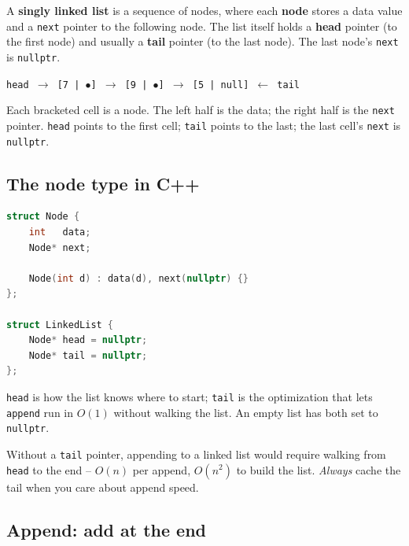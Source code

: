 \documentclass[11pt]{article}
\begin{document}
\begin{defnbox}
A \textbf{singly linked list} is a sequence of nodes, where each
\textbf{node} stores a data value and a \texttt{next} pointer to the
following node. The list itself holds a \textbf{head} pointer (to
the first node) and usually a \textbf{tail} pointer (to the last
node). The last node's \texttt{next} is \texttt{nullptr}.
\end{defnbox}

\begin{ideabox}
\texttt{head $\to$ [7 | $\bullet$] $\to$ [9 | $\bullet$] $\to$ [5 | null] $\leftarrow$ tail}

Each bracketed cell is a node. The left half is the data; the right
half is the \texttt{next} pointer. \texttt{head} points to the first
cell; \texttt{tail} points to the last; the last cell's \texttt{next}
is \texttt{nullptr}.
\end{ideabox}

\subsection{The node type in C++}

\begin{examplebox}
\begin{lstlisting}[basicstyle=\ttfamily\small,frame=single,language=C++]
struct Node {
    int   data;
    Node* next;

    Node(int d) : data(d), next(nullptr) {}
};

struct LinkedList {
    Node* head = nullptr;
    Node* tail = nullptr;
};
\end{lstlisting}
\texttt{head} is how the list knows where to start; \texttt{tail} is
the optimization that lets \texttt{append} run in $O(1)$ without
walking the list. An empty list has both set to \texttt{nullptr}.
\end{examplebox}

\begin{warnbox}
Without a \texttt{tail} pointer, appending to a linked list would
require walking from \texttt{head} to the end -- $O(n)$ per append,
$O(n^2)$ to build the list. \emph{Always} cache the tail when you
care about append speed.
\end{warnbox}

\subsection{Append: add at the end}
\end{document}
